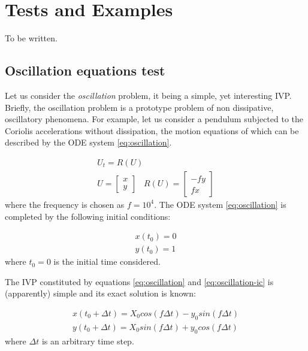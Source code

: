 \documentclass[pdftex,preprint,3p,times,numbers]{elsarticle}
\begin{document}
\clearpage

\section{Tests and Examples}\label{sec:Tests}

{\color{red} To be written.}

\subsection{Oscillation equations test}

Let us consider the \emph{oscillation} problem, it being a simple, yet interesting IVP. Briefly, the oscillation problem is a prototype problem of non dissipative, oscillatory phenomena. For example, let us consider a pendulum subjected to the Coriolis accelerations without dissipation, the motion equations of which can be described by the ODE system \ref{eq:oscillation}.

\begin{equation}
\begin{matrix}
U_t = R(U)  \\
U = \begin{bmatrix}
x \\
y
\end{bmatrix}\;\;\;
R(U) = \begin{bmatrix}
-f y \\
f x
\end{bmatrix}
\end{matrix}
\label{eq:oscillation}
\end{equation}
where the frequency is chosen as $f=10^4$. The ODE system \ref{eq:oscillation} is completed by the following initial conditions:

\begin{equation}
\begin{matrix}
  x(t_0) = 0 \\
  y(t_0) = 1
\end{matrix}
\label{eq:oscillation-ic}
\end{equation}
where $t_0=0$ is the initial time considered.

The IVP constituted by equations \ref{eq:oscillation} and \ref{eq:oscillation-ic} is (apparently) simple and its exact solution is known:

\begin{equation}
\begin{matrix}
  x(t_0 + \Delta t) = X_0 cos(f \Delta t) - y_0 sin(f \Delta t) \\
  y(t_0 + \Delta t) = X_0 sin(f \Delta t) + y_0 cos(f \Delta t)
\end{matrix}
\label{eq:oscillation-exact}
\end{equation}
where $\Delta t$ is an arbitrary time step.
\end{document}

